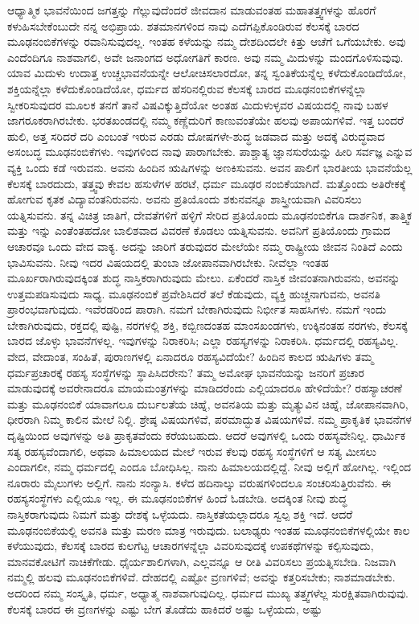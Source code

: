 ಆಧ್ಯಾತ್ಮಿಕ ಭಾವನೆಯಿಂದ ಜಗತ್ತನ್ನು ಗೆಲ್ಲುವುದೆಂದರೆ ಜೀವದಾನ ಮಾಡುವಂತಹ ಮಹಾತತ್ತ್ವಗಳನ್ನು ಹೊರಗೆ ಕಳುಹಿಸಬೇಕೆಂಬುದೇ ನನ್ನ ಅಭಿಪ್ರಾಯ. ಶತಮಾನಗಳಿಂದ ನಾವು ಎದೆಗಪ್ಪಿಕೊಂಡಿರುವ ಕೆಲಸಕ್ಕೆ ಬಾರದ ಮೂಢನಂಬಿಕೆಗಳನ್ನು ರವಾನಿಸುವುದಲ್ಲ. ಇಂತಹ ಕಳೆಯನ್ನು ನಮ್ಮ ದೇಶದಿಂದಲೇ ಕಿತ್ತು ಆಚೆಗೆ ಒಗೆಯಬೇಕು. ಅವು ಎಂದೆಂದಿಗೂ ನಾಶವಾಗಲಿ, ಅವೇ ಜನಾಂಗದ ಅಧೋಗತಿಗೆ ಕಾರಣ. ಅವು ನಮ್ಮ ಮಿದುಳನ್ನು ಮಂದಗೊಳಿಸುವುವು. ಯಾವ ಮಿದುಳು ಉದಾತ್ತ ಉಚ್ಚಭಾವನೆಯನ್ನೇ ಆಲೋಚಿಸಲಾರದೋ, ತನ್ನ ಸ್ವಂತಿಕೆಯನ್ನೆಲ್ಲ ಕಳೆದುಕೊಂಡಿದೆಯೋ, ಶಕ್ತಿಯನ್ನೆಲ್ಲಾ ಕಳೆದುಕೊಂಡಿದೆಯೋ, ಧರ್ಮದ ಹೆಸರಿನಲ್ಲಿರುವ ಕೆಲಸಕ್ಕೆ ಬಾರದ ಮೂಢನಂಬಿಕೆಗಳನ್ನೆಲ್ಲಾ ಸ್ವೀಕರಿಸುವುದರ ಮೂಲಕ ತನಗೆ ತಾನೆ ವಿಷವಿಕ್ಕುತ್ತಿದೆಯೋ ಅಂತಹ ಮಿದುಳುಳ್ಳವರ ವಿಷಯದಲ್ಲಿ ನಾವು ಬಹಳ ಜಾಗರೂಕರಾಗಿರಬೇಕು. ಭರತಖಂಡದಲ್ಲಿ ನಮ್ಮ ಕಣ್ಣೆದುರಿಗೆ ಕಾಣುವಂತೆಯೇ ಹಲವು ಅಪಾಯಗಳಿವೆ. ಇತ್ತ ಬಂದರೆ ಹುಲಿ, ಅತ್ತ ಸರಿದರೆ ದರಿ ಎಂಬಂತೆ ಇರುವ ಎರಡು ದೋಷಗಳೇ-ಶುದ್ಧ ಜಡವಾದ ಮತ್ತು ಅದಕ್ಕೆ ವಿರುದ್ಧವಾದ ಅಸಂಬದ್ಧ ಮೂಢನಂಬಿಕೆಗಳು. ಇವುಗಳಿಂದ ನಾವು ಪಾರಾಗಬೇಕು. ಪಾಶ್ಚಾತ್ಯ ಜ್ಞಾನಸುರೆಯನ್ನು ಹೀರಿ ಸರ್ವಜ್ಞ ಎನ್ನುವ ವ್ಯಕ್ತಿ ಒಂದು ಕಡೆ ಇರುವನು. ಅವನು ಹಿಂದಿನ ಋಷಿಗಳನ್ನು ಅಣಕಿಸುವನು. ಅವನ ಪಾಲಿಗೆ ಭಾರತೀಯ ಭಾವನೆಯೆಲ್ಲ ಕೆಲಸಕ್ಕೆ ಬಾರದುದು, ತತ್ತ್ವವು ಕೇವಲ ಹಸುಳೆಗಳ ಹರಟೆ, ಧರ್ಮ ಮೂಢರ ನಂಬಿಕೆಯಾಗಿದೆ. ಮತ್ತೊಂದು ಅತಿರೇಕಕ್ಕೆ ಹೋಗುವ ಕೃತಕ ವಿದ್ಯಾವಂತನಿರುವನು. ಅವನು ಪ್ರತಿಯೊಂದು ಶಕುನವನ್ನೂ ಶಾಸ್ತ್ರೀಯವಾಗಿ ವಿವರಿಸಲು ಯತ್ನಿಸುವನು. ತನ್ನ ವಿಚಿತ್ರ ಜಾತಿಗೆ, ದೇವತೆಗಳಿಗೆ ಹಳ್ಳಿಗೆ ಸೇರಿದ ಪ್ರತಿಯೊಂದು ಮೂಢನಂಬಿಕೆಗೂ ದಾರ್ಶನಿಕ, ತಾತ್ತ್ವಿಕ ಮತ್ತು ಇನ್ನು ಎಂತೆಂತಹದೋ ಬಾಲಿಶವಾದ ವಿವರಣೆ ಕೊಡಲು ಯತ್ನಿಸುವನು. ಅವನಿಗೆ ಪ್ರತಿಯೊಂದು ಗ್ರಾಮದ ಆಚಾರವೂ ಒಂದು ವೇದ ವಾಕ್ಯ. ಅದನ್ನು ಜಾರಿಗೆ ತರುವುದರ ಮೇಲೆಯೇ ನಮ್ಮ ರಾಷ್ಟ್ರೀಯ ಜೀವನ ನಿಂತಿದೆ ಎಂದು ಭಾವಿಸುವನು. ನೀವು ಇದರ ವಿಷಯದಲ್ಲಿ ತುಂಬಾ ಜೋಪಾನವಾಗಿರಬೇಕು. ನೀವೆಲ್ಲಾ ಇಂತಹ ಮೂರ್ಖರಾಗಿರುವುದಕ್ಕಿಂತ ಶುದ್ಧ ನಾಸ್ತಿಕರಾಗಿರುವುದು ಮೇಲು. ಏಕೆಂದರೆ ನಾಸ್ತಿಕ ಜೀವಂತನಾಗಿರುವನು, ಅವನನ್ನು ಉತ್ತಮಪಡಿಸುವುದು ಸಾಧ್ಯ. ಮೂಢನಂಬಿಕೆ ಪ್ರವೇಶಿಸಿದರೆ ತಲೆ ಕೆಡುವುದು, ವ್ಯಕ್ತಿ ಹುಚ್ಚನಾಗುವನು, ಅವನತಿ ಪ್ರಾರಂಭವಾಗುವುದು. ಇವೆರಡರಿಂದ ಪಾರಾಗಿ. ನಮಗೆ ಬೇಕಾಗಿರುವುದು ನಿರ್ಭೀತ ಸಾಹಸಿಗಳು. ನಮಗೆ ಇಂದು ಬೇಕಾಗಿರುವುದು, ರಕ್ತದಲ್ಲಿ ಪುಷ್ಟಿ, ನರಗಳಲ್ಲಿ ಶಕ್ತಿ, ಕಬ್ಬಿಣದಂತಹ ಮಾಂಸಖಂಡಗಳು, ಉಕ್ಕಿನಂತಹ ನರಗಳು, ಕೆಲಸಕ್ಕೆ ಬಾರದ ಜೊಳ್ಳು ಭಾವನೆಗಳಲ್ಲ. ಇವುಗಳನ್ನು ನಿರಾಕರಿಸಿ; ಎಲ್ಲಾ ರಹಸ್ಯಗಳನ್ನು ನಿರಾಕರಿಸಿ. ಧರ್ಮದಲ್ಲಿ ರಹಸ್ಯವಿಲ್ಲ. ವೇದ, ವೇದಾಂತ, ಸಂಹಿತೆ, ಪುರಾಣಗಳಲ್ಲಿ ಏನಾದರೂ ರಹಸ್ಯವಿದೆಯೇ? ಹಿಂದಿನ ಕಾಲದ ಋಷಿಗಳು ತಮ್ಮ ಧರ್ಮಪ್ರಚಾರಕ್ಕೆ ರಹಸ್ಯ ಸಂಸ್ಥೆಗಳನ್ನು ಸ್ಥಾಪಿಸಿದರೇನು? ತಮ್ಮ ಅಮೋಘ ಭಾವನೆಯನ್ನು ಜನರಿಗೆ ಪ್ರಚಾರ ಮಾಡುವುದಕ್ಕೆ ಅವರೇನಾದರೂ ಮಾಯಮಂತ್ರಗಳನ್ನು ಮಾಡಿದರೆಂದು ಎಲ್ಲಿಯಾದರೂ ಹೇಳಿದೆಯೇ? ರಹಸ್ಯಾಚರಣೆ ಮತ್ತು ಮೂಢನಂಬಿಕೆ ಯಾವಾಗಲೂ ದುರ್ಬಲತೆಯ ಚಿಹ್ನೆ, ಅವನತಿಯ ಮತ್ತು ಮೃತ್ಯುವಿನ ಚಿಹ್ನೆ, ಜೋಪಾನವಾಗಿರಿ, ಧೀರರಾಗಿ ನಿಮ್ಮ ಕಾಲಿನ ಮೇಲೆ ನಿಲ್ಲಿ. ಶ್ರೇಷ್ಠ ವಿಷಯಗಳಿವೆ, ಪರಮಾದ್ಭುತ ವಿಷಯಗಳಿವೆ. ನಮ್ಮ ಪ್ರಾಕೃತಿಕ ಭಾವನೆಗಳ ದೃಷ್ಟಿಯಿಂದ ಅವುಗಳನ್ನು ಅತಿ ಪ್ರಾಕೃತವೆಂದು ಕರೆಯಬಹುದು. ಆದರೆ ಅವುಗಳಲ್ಲಿ ಒಂದು ರಹಸ್ಯವೇನಿಲ್ಲ. ಧಾರ್ಮಿಕ ಸತ್ಯ ರಹಸ್ಯವೆಂದಾಗಲಿ, ಅಥವಾ ಹಿಮಾಲಯದ ಮೇಲೆ ಇರುವ ಕೆಲವು ರಹಸ್ಯ ಸಂಸ್ಥೆಗಳಿಗೆ ಆ ಸತ್ಯ ಮೀಸಲು ಎಂದಾಗಲೀ, ನಮ್ಮ ಧರ್ಮದಲ್ಲಿ ಎಂದೂ ಬೋಧಿಸಿಲ್ಲ. ನಾನು ಹಿಮಾಲಯದಲ್ಲಿದ್ದೆ. ನೀವು ಅಲ್ಲಿಗೆ ಹೋಗಿಲ್ಲ. ಇಲ್ಲಿಂದ ನೂರಾರು ಮೈಲುಗಳು ಅಲ್ಲಿಗೆ. ನಾನು ಸಂನ್ಯಾಸಿ. ಕಳೆದ ಹದಿನಾಲ್ಕು ವರುಷಗಳಿಂದಲೂ ಸಂಚರಿಸುತ್ತಿರುವೆನು. ಈ ರಹಸ್ಯಸಂಸ್ಥೆಗಳು ಎಲ್ಲಿಯೂ ಇಲ್ಲ. ಈ ಮೂಢನಂಬಿಕೆಗಳ ಹಿಂದೆ ಓಡಬೇಡಿ. ಅದಕ್ಕಿಂತ ನೀವು ಶುದ್ಧ ನಾಸ್ತಿಕರಾಗುವುದು ನಿಮಗೆ ಮತ್ತು ದೇಶಕ್ಕೆ ಒಳ್ಳೆಯದು. ನಾಸ್ತಿಕತೆಯಲ್ಲಾದರೂ ಸ್ವಲ್ಪ ಶಕ್ತಿ ಇದೆ. ಆದರೆ ಮೂಢನಂಬಿಕೆಯಲ್ಲಿ ಅವನತಿ ಮತ್ತು ಮರಣ ಮಾತ್ರ ಇರುವುದು. ಬಲಾಢ್ಯರು ಇಂತಹ ಮೂಢನಂಬಿಕೆಗಳಲ್ಲಿಯೇ ಕಾಲ ಕಳೆಯುವುದು, ಕೆಲಸಕ್ಕೆ ಬಾರದ ಕುಲಗೆಟ್ಟ ಆಚಾರಗಳನ್ನೆಲ್ಲಾ ವಿವರಿಸುವುದಕ್ಕೆ ಉಪಕಥೆಗಳನ್ನು ಕಲ್ಪಿಸುವುದು, ಮಾನವಕೋಟಿಗೆ ನಾಚಿಕೆಗೇಡು. ಧೈರ್ಯಶಾಲಿಗಳಾಗಿ, ಎಲ್ಲವನ್ನೂ ಆ ರೀತಿ ವಿವರಿಸಲು ಪ್ರಯತ್ನಿಸಬೇಡಿ. ನಿಜವಾಗಿ ನಮ್ಮಲ್ಲಿ ಹಲವು ಮೂಢನಂಬಿಕೆಗಳಿವೆ. ದೇಹದಲ್ಲಿ ಎಷ್ಟೋ ವ್ರಣಗಳಿವೆ; ಅವನ್ನು ಕತ್ತರಿಸಬೇಕು; ನಾಶಮಾಡಬೇಕು. ಅದರಿಂದ ನಮ್ಮ ಸಂಸ್ಕೃತಿ, ಧರ್ಮ, ಅಧ್ಯಾತ್ಮ ನಾಶವಾಗುವುದಿಲ್ಲ. ಧರ್ಮದ ಮುಖ್ಯ ತತ್ತ್ವಗಳೆಲ್ಲ ಸುರಕ್ಷಿತವಾಗಿರುವುವು. ಕೆಲಸಕ್ಕೆ ಬಾರದ ಈ ವ್ರಣಗಳನ್ನು ಎಷ್ಟು ಬೇಗ ತೊಡೆದು ಹಾಕಿದರೆ ಅಷ್ಟು ಒಳ್ಳೆಯದು, ಅಷ್ಟು 